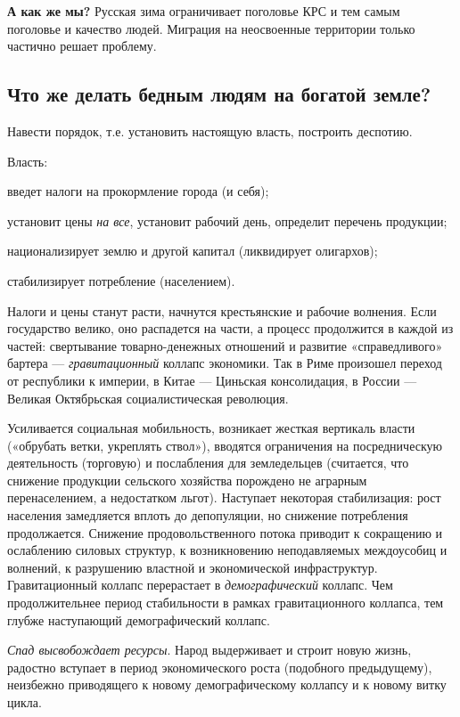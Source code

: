 \textbf{А как же мы?} Русская зима ограничивает поголовье КРС и тем самым поголовье и качество людей. Миграция на
неосвоенные территории только частично решает проблему.

\subsection[Что же делать бедным людям на богатой земле?]{Что же делать бедным людям на богатой земле?}

Навести порядок, т.е. установить настоящую власть, построить деспотию.


Власть:


введет налоги на прокормление города (и себя);


установит цены \textit{на все}, установит рабочий день, определит перечень продукции;


национализирует землю и другой капитал (ликвидирует олигархов);


стабилизирует потребление (населением).


Налоги и цены станут расти, начнутся крестьянские и рабочие волнения. Если государство велико, оно распадется на части,
а процесс продолжится в каждой из частей: свертывание товарно-денежных отношений и развитие «справедливого» бартера —
\textit{гравитационный} коллапс экономики. Так в Риме произошел переход от республики к империи, в Китае — Циньская
консолидация, в России — Великая Октябрьская социалистическая революция.


Усиливается социальная мобильность, возникает жесткая вертикаль власти («обрубать ветки, укреплять ствол»), вводятся
ограничения на посредническую деятельность (торговую) и послабления для земледельцев (считается, что снижение продукции
сельского хозяйства порождено не аграрным перенаселением, а недостатком льгот). Наступает некоторая стабилизация: рост
населения замедляется вплоть до депопуляции, но снижение потребления продолжается. Снижение продовольственного потока
приводит к сокращению и ослаблению силовых структур, к возникновению неподавляемых междоусобиц и волнений, к разрушению
властной и экономической инфраструктур. Гравитационный коллапс перерастает в \textit{демографический} коллапс. Чем
продолжительнее период стабильности в рамках гравитационного коллапса, тем глубже наступающий демографический коллапс.



\textit{Спад высвобождает ресурсы}. Народ выдерживает и строит новую жизнь, радостно вступает в период
экономического роста (подобного предыдущему), неизбежно приводящего к новому демографическому коллапсу и к новому витку
цикла.

